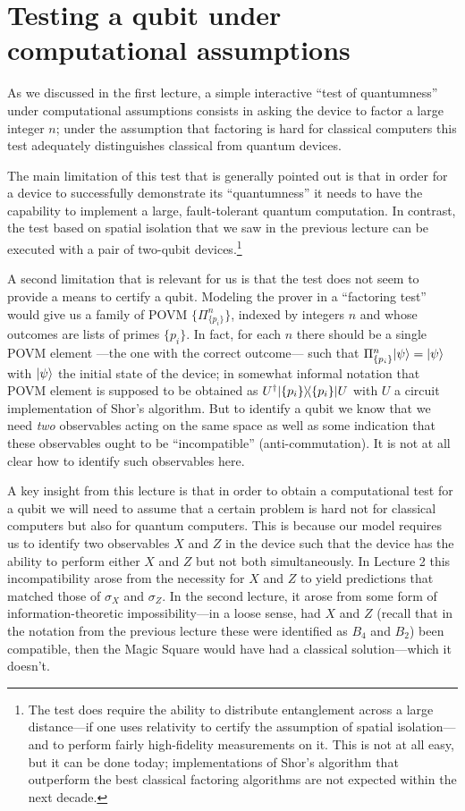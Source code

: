 \chapter{Testing a qubit under computational assumptions}
\label{chap:computational-test}

As we discussed in the first lecture, a simple interactive ``test of quantumness'' under computational assumptions consists in asking the device to factor a large integer $n$; under the assumption that factoring is hard for classical computers this test adequately distinguishes classical from quantum devices. 

The main limitation of this test that is generally pointed out is that in order for a device to successfully demonstrate its ``quantumness'' it needs to have the capability to implement a large, fault-tolerant quantum computation. In contrast, the test based on spatial isolation that we saw in the previous lecture can be executed with a pair of two-qubit devices.\footnote{The test does require the ability to distribute entanglement across a large distance---if one uses relativity to certify the assumption of spatial isolation---and to perform fairly high-fidelity measurements on it. This is not at all easy, but it can be done today; implementations of Shor's algorithm that outperform the best classical factoring algorithms are not expected within the next decade.}

A second limitation that is relevant for us is that the test does not seem to provide a means to certify a qubit. Modeling the prover in a ``factoring test'' would give us a family of POVM $\{\Pi^n_{\{p_i\}}\}$, indexed by integers $n$ and whose outcomes are lists of primes $\{p_i\}$. In fact, for each $n$ there should be a single POVM element ---the one with the correct outcome--- such that $\Pi^n_{\{p_i\}} |\psi\rangle = |\psi\rangle$ with $|\psi\rangle$ the initial state of the device; in somewhat informal notation that POVM element is supposed to be obtained as $U^\dagger |\{p_i\}\rangle\!\langle\{p_i\}| U$ with $U$ a circuit implementation of Shor's algorithm. But to identify a qubit we know that we need \emph{two} observables acting on the same space as well as some indication that these observables ought to be ``incompatible'' (anti-commutation). It is not at all clear how to identify such observables here. 

A key insight from this lecture is that in order to obtain a computational test for a qubit we will need to assume that a certain problem is hard not for classical computers but also for quantum computers. This is because our model requires us to identify two observables $X$ and $Z$ in the device such that the device has the ability to perform either $X$ and $Z$ but not both simultaneously. In Lecture 2 this incompatibility arose from the necessity for $X$ and $Z$ to yield predictions that matched those of $\sigma_X$ and $\sigma_Z$. In the second lecture, it arose from some form of information-theoretic impossibility---in a loose sense, had $X$ and $Z$ (recall that in the notation from the previous lecture these were identified as $B_4$ and $B_2$) been compatible, then the Magic Square would have had a classical solution---which it doesn't. 

